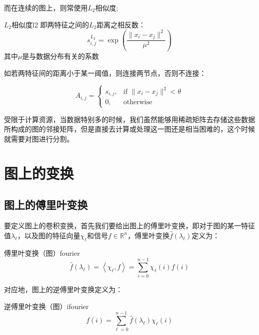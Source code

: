 \documentclass[color=gray,base=hide,cn]{elegantbook}
\begin{document}
而在连续的图上，则常使用$L_2$相似度;

\begin{definition}{$L_2$相似度}{l2}
    即两特征之间的$L_2$距离之相反数：
    \begin{equation}
        s^{L_2}_{i,j} = \exp \left ( \frac{\|x_i - x_j \|^2}{\mu^2}  \right )
    \end{equation}
    其中$\mu$是与数据分布有关的系数
\end{definition}

如若两特征间的距离小于某一阈值，则连接两节点，否则不连接：

\begin{equation}
    A_{i,j} = \left\{\begin{matrix}
 s_{i,j}, & \text{if } \|x_i - x_j \|^2 < \theta \\ 
0, & \text{otherwise}
\end{matrix}\right.
\end{equation}

受限于计算资源，当数据特别多的时候，我们虽然能够用稀疏矩阵去存储这些数据所构成的图的邻接矩阵，但是直接去计算或处理这一图还是相当困难的，这个时候就需要对图进行分割。

\chapter{图上的变换}

\section{图上的傅里叶变换}

要定义图上的卷积变换，首先我们要给出图上的傅里叶变换，即对于图的某一特征值$\lambda_{\ell}$，以及图的特征向量$\chi _\ell$和信号$f \in \mathbb{R}^n$，傅里叶变换$\hat{f}(\lambda_{\ell})$定义为：

\begin{definition}{傅里叶变换（图）}{fourier}
    \begin{equation}
        \hat{f}(\lambda_{\ell}) = \left \langle \chi_\ell,f \right \rangle = \sum_{i=0}^{n-1}\chi_\ell(i)f(i)
    \end{equation}
\end{definition}

对应地，图上的逆傅里叶变换定义为：

\begin{definition}{逆傅里叶变换（图）}{ifourier}
    \begin{equation}
        f(i) = \sum_{\ell=0}^{n-1} \hat{f}(\lambda_{\ell}) \chi_{\ell}(i)
    \end{equation}
\end{definition}
\end{document}
